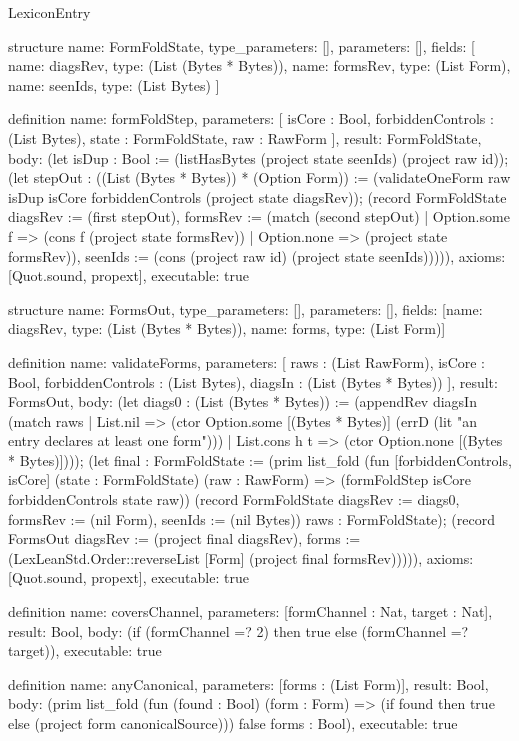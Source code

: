 \begin{lexlean}{LexiconEntry}
\begin{semanticmodule}
structure{
  name: FormFoldState,
  type_parameters: [],
  parameters: [],
  fields: [
    {name: diagsRev, type: (List (Bytes * Bytes))},
    {name: formsRev, type: (List Form)},
    {name: seenIds, type: (List Bytes)}
  ]
}

definition{
  name: formFoldStep,
  parameters: [
    isCore : Bool,
    forbiddenControls : (List Bytes),
    state : FormFoldState,
    raw : RawForm
  ],
  result: FormFoldState,
  body: (let isDup : Bool := (listHasBytes (project state seenIds) (project raw id)); (let stepOut : ((List (Bytes * Bytes)) * (Option Form)) := (validateOneForm raw isDup isCore forbiddenControls (project state diagsRev)); (record FormFoldState {diagsRev := (first stepOut), formsRev := (match (second stepOut)
    | Option.some f => (cons f (project state formsRev))
    | Option.none => (project state formsRev)), seenIds := (cons (project raw id) (project state seenIds))}))),
  axioms: [Quot.sound, propext],
  executable: true
}

structure{
  name: FormsOut,
  type_parameters: [],
  parameters: [],
  fields: [{name: diagsRev, type: (List (Bytes * Bytes))}, {name: forms, type: (List Form)}]
}

definition{
  name: validateForms,
  parameters: [
    raws : (List RawForm),
    isCore : Bool,
    forbiddenControls : (List Bytes),
    diagsIn : (List (Bytes * Bytes))
  ],
  result: FormsOut,
  body: (let diags0 : (List (Bytes * Bytes)) := (appendRev diagsIn (match raws
    | List.nil => (ctor Option.some [(Bytes * Bytes)] (errD (lit "an entry declares at least one form")))
    | List.cons h t => (ctor Option.none [(Bytes * Bytes)]))); (let final : FormFoldState := (prim list_fold (fun [forbiddenControls, isCore] (state : FormFoldState) (raw : RawForm) => (formFoldStep isCore forbiddenControls state raw)) (record FormFoldState {diagsRev := diags0, formsRev := (nil Form), seenIds := (nil Bytes)}) raws : FormFoldState); (record FormsOut {diagsRev := (project final diagsRev), forms := (LexLeanStd.Order::reverseList [Form] (project final formsRev))}))),
  axioms: [Quot.sound, propext],
  executable: true
}

definition{
  name: coversChannel,
  parameters: [formChannel : Nat, target : Nat],
  result: Bool,
  body: (if (formChannel =? 2) then true else (formChannel =? target)),
  executable: true
}

definition{
  name: anyCanonical,
  parameters: [forms : (List Form)],
  result: Bool,
  body: (prim list_fold (fun (found : Bool) (form : Form) => (if found then true else (project form canonicalSource))) false forms : Bool),
  executable: true
}


\end{semanticmodule}
\end{lexlean}
